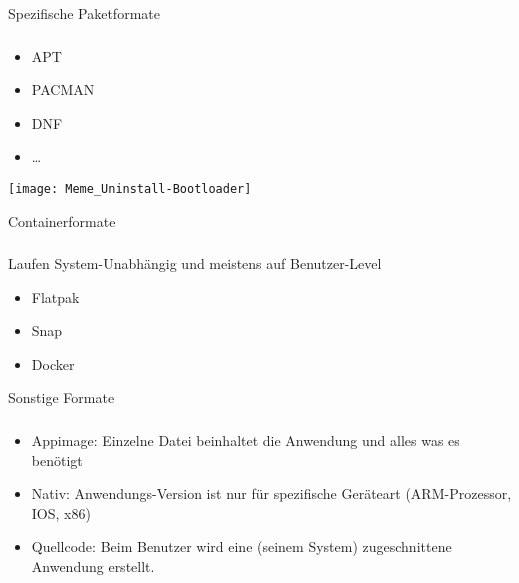 \begin{frame}{Spezifische Paketformate}
    \subsubsection{}\label{subsubsec:spezifische-formate}

        \begin{itemize}
            \item<3-> APT
            \item<4-> PACMAN
            \item<5-> DNF
            \item<6-> \ldots
        \end{itemize}
    \endminipage\hfill
        \texttt{[image: Meme\_Uninstall-Bootloader]}
    \endminipage\hfill
\end{frame}

\begin{frame}{Containerformate}
    \subsubsection{}\label{subsubsec:containerformate}

    \pause

    Laufen System-Unabhängig und meistens auf Benutzer-Level
    \pause

    \begin{itemize}
        \item Flatpak\pause
        \item Snap\pause
        \item Docker
    \end{itemize}

\end{frame}

\begin{frame}{Sonstige Formate}
    \subsubsection{}\label{subsubsec:sonstige-formate}

    \pause

    \begin{itemize}
        \item Appimage: Einzelne Datei beinhaltet die Anwendung und alles was es benötigt\pause
        \item Nativ: Anwendungs-Version ist nur für spezifische Geräteart (ARM-Prozessor, IOS, x86)\pause
        \item Quellcode: Beim Benutzer wird eine (seinem System) zugeschnittene Anwendung erstellt.
    \end{itemize}

\end{frame}

